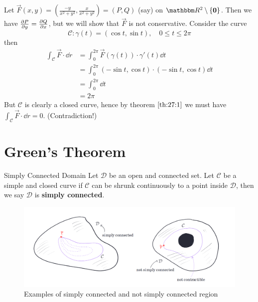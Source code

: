 \documentclass[../Analysis-3]{subfiles}
\begin{document}
\begin{Eg}{}{}
    Let $\vec{F}(x,y) = \left( \frac{-y}{x^2+y^2}, \frac{x}{x^2+y^2} \right) = (P,Q)$ (say) on $\R^2 \setminus \{\mathbf{0}\}$. Then we have $\pdv{P}{y} = \pdv{Q}{x}$, but we will show that $\vec{F}$ is not conservative. Consider the curve
    \[
        \mathcal{C} : \gamma(t) = ( \cos t, \sin t), \quad 0 \leq t \leq 2\pi
    \]
    then
    \begin{align*}
        \int_{\mathcal{C}} \vec{F} \cdot \dd r & = \int_0^{2\pi}  \vec{F}(\gamma(t))\cdot \gamma'(t)  \dd t       \\
                                               & = \int_0^{2\pi}  (-\sin t, \cos t) \cdot (-\sin t, \cos t) \dd t \\
                                               & = \int_0^{2\pi} \dd t                                            \\
                                               & = 2\pi
    \end{align*}
    But $\mathcal{C}$ is clearly a closed curve, hence by theorem $\ref{th:27:1}$ we must have $\int_{\mathcal{C}} \vec{F} \cdot \dd r = 0$. (Contradiction!)
\end{Eg}

\section{Green's Theorem}

\begin{Def}{Simply Connected Domain}{}
    Let $\mathcal{D}$ be an open and connected set. Let $\mathcal{C}$ be a simple and closed curve if $\mathcal{C}$ can be shrunk continuously to a point inside $\mathcal{D}$, then we say $\mathcal{D}$ is \textbf{simply connected}.
\end{Def}

\begin{figure}[h]
    \centering
    \includegraphics[width=\textwidth]{../figures/lec27.4.png}
    \caption{Examples of simply connected and not simply connected region}
    \label{fig4:27}
\end{figure}
\end{document}

